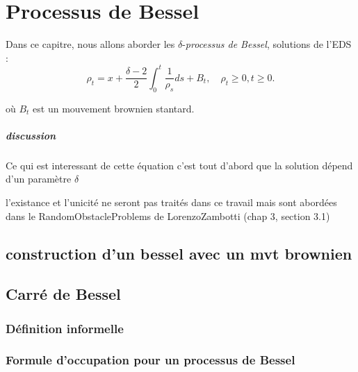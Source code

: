 \documentclass[openany]{book}
\newcommand{\1}{\mathbbm{1}}
\theoremstyle{thmfont}
\theoremstyle{deffont}
\theoremstyle{thmfont}
\theoremstyle{deffont}
\begin{document}
\chapter{Processus de Bessel}
Dans ce capitre, nous allons aborder les $\delta$-\textit{processus de Bessel}, solutions de l'EDS :
\begin{equation}
  \rho_t = x + \dfrac{\delta-2}{2} \int_0^t \dfrac{1}{\rho_s} ds + B_t, \quad \rho_t \geq 0, t \geq 0.
  \label{eq:BesselPrSDE}
\end{equation}

où $B_t$ est un mouvement brownien stantard.

\paragraph{discussion} Ce qui est interessant de cette équation c'est tout d'abord que la solution dépend d'un paramètre $\delta$ 

{\color{red}l'existance et l'unicité ne seront pas traités dans ce travail mais sont abordées dans le RandomObstacleProblems de LorenzoZambotti (chap 3, section 3.1)}

\section{construction d'un bessel avec un mvt brownien}
\section{Carré de Bessel}
\subsection{Définition informelle}
\subsection{Formule d'occupation pour un processus de Bessel}
\end{document}

